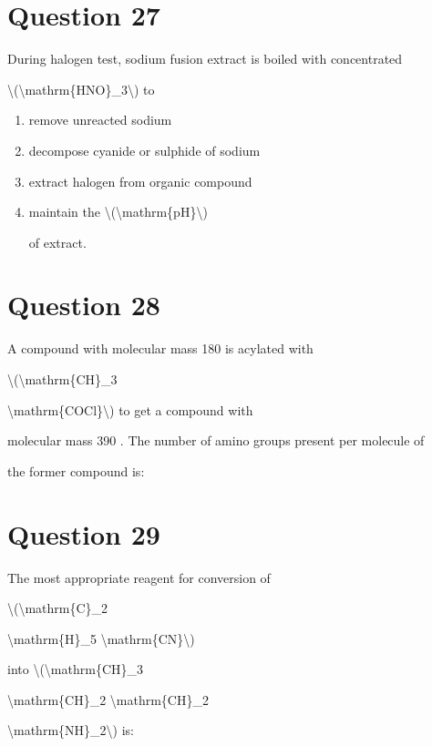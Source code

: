 \documentclass{article}
\begin{document}
\section*{Question 27}
During halogen test, sodium fusion extract is boiled with concentrated

\textbackslash(\textbackslash mathrm\{HNO\}\_3\textbackslash) to


\begin{enumerate}[label=(\alph*)]
\item remove unreacted sodium


\item decompose cyanide or sulphide of sodium


\item extract halogen from organic compound


\item maintain the \textbackslash(\textbackslash mathrm\{pH\}\textbackslash)

of extract.


\end{enumerate}
\newpage
\section*{Question 28}
A compound with molecular mass 180 is acylated with

\textbackslash(\textbackslash mathrm\{CH\}\_3

\textbackslash mathrm\{COCl\}\textbackslash) to get a compound with

molecular mass 390 . The number of amino groups present per molecule of

the former compound is:


\begin{enumerate}[label=(\alph*)]
\end{enumerate}
\newpage
\section*{Question 29}
The most appropriate reagent for conversion of

\textbackslash(\textbackslash mathrm\{C\}\_2

\textbackslash mathrm\{H\}\_5 \textbackslash mathrm\{CN\}\textbackslash)

into \textbackslash(\textbackslash mathrm\{CH\}\_3

\textbackslash mathrm\{CH\}\_2 \textbackslash mathrm\{CH\}\_2

\textbackslash mathrm\{NH\}\_2\textbackslash) is:
\end{document}
